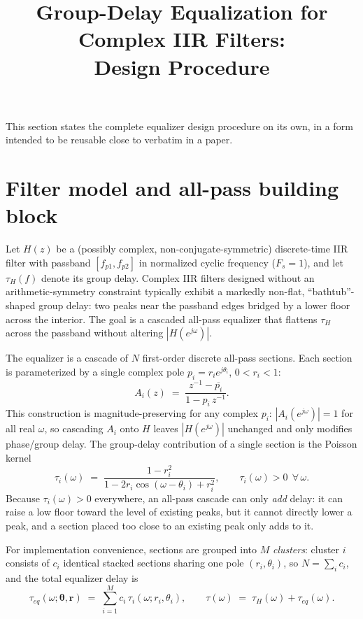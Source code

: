 \documentclass[11pt]{article}
\title{Group-Delay Equalization for Complex IIR Filters:\\ Design Procedure}
\author{}
\date{}
\begin{document}
\maketitle

\noindent This section states the complete equalizer design procedure on
its own, in a form intended to be reusable close to verbatim in a paper.

\section{Filter model and all-pass building block}

Let $H(z)$ be a (possibly complex, non-conjugate-symmetric) discrete-time
IIR filter with passband $[f_{p1}, f_{p2}]$ in normalized cyclic
frequency ($F_s = 1$), and let $\tau_H(f)$ denote its group delay.
Complex IIR filters designed without an arithmetic-symmetry constraint
typically exhibit a markedly non-flat, ``bathtub''-shaped group delay:
two peaks near the passband edges bridged by a lower floor across the
interior. The goal is a cascaded all-pass equalizer that flattens
$\tau_H$ across the passband without altering $|H(e^{j\omega})|$.

The equalizer is a cascade of $N$ first-order discrete all-pass
sections. Each section is parameterized by a single complex pole
$p_i = r_i e^{j\theta_i}$, $0 < r_i < 1$:
\begin{equation}
A_i(z) \;=\; \frac{z^{-1} - \overline{p_i}}{1 - p_i\, z^{-1}}.
\label{eq:allpass}
\end{equation}
This construction is magnitude-preserving for any complex $p_i$:
$|A_i(e^{j\omega})| = 1$ for all real $\omega$, so cascading $A_i$ onto
$H$ leaves $|H(e^{j\omega})|$ unchanged and only modifies phase/group
delay. The group-delay contribution of a single section is the Poisson
kernel
\begin{equation}
\tau_i(\omega) \;=\; \frac{1 - r_i^2}{1 - 2 r_i \cos(\omega - \theta_i) + r_i^2},
\qquad \tau_i(\omega) > 0 \ \ \forall\, \omega.
\label{eq:poisson}
\end{equation}
Because $\tau_i(\omega) > 0$ everywhere, an all-pass cascade can only
\emph{add} delay: it can raise a low floor toward the level of existing
peaks, but it cannot directly lower a peak, and a section placed too
close to an existing peak only adds to it.

For implementation convenience, sections are grouped into $M$
\emph{clusters}: cluster $i$ consists of $c_i$ identical stacked
sections sharing one pole $(r_i, \theta_i)$, so $N = \sum_i c_i$, and the
total equalizer delay is
\begin{equation}
\tau_{eq}(\omega; \boldsymbol\theta, \mathbf r) \;=\; \sum_{i=1}^{M} c_i\, \tau_i(\omega; r_i, \theta_i),
\qquad
\tau(\omega) \;=\; \tau_H(\omega) + \tau_{eq}(\omega).
\label{eq:total}
\end{equation}
\end{document}
